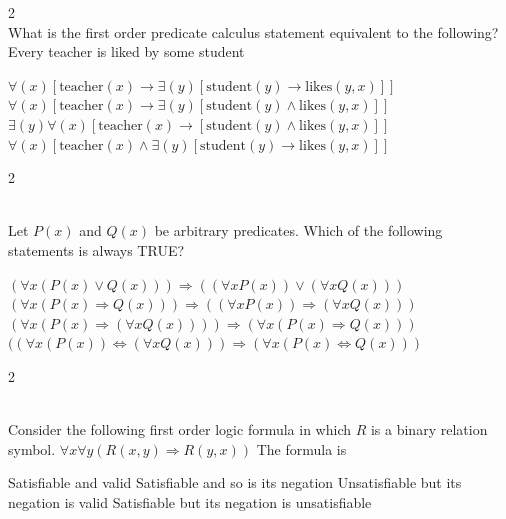 \documentclass[12pt]{exam}
\begin{document}
\begin{questions}
\begin{multicols*}{2}
 \\[0.2cm]
{\Large What is the first order predicate calculus statement equivalent to the following? Every teacher is liked by some student}
\begin{choices}
  \choice $\forall(x) [\text{teacher} (x) \to \exists(y) [\text{student} (y) \to \text{likes} (y, x)]]$
  \choice $\forall(x) [\text{teacher} (x) \to \exists(y) [\text{student} (y) \wedge \text{likes} (y, x)]]$
  \choice $\exists(y) \forall(x) [\text{teacher} (x) \to [\text{student} (y) \wedge \text{likes} (y, x)]]$
  \choice $\forall(x) [\text{teacher} (x) \wedge \exists(y) [\text{student} (y) \to \text{likes} (y, x)]]$
\end{choices}

\end{multicols*}
\vspace{0.6cm}
\newpage
\begin{multicols*}{2}

 \\[0.2cm]
{\Large Let $P(x)$ and $Q(x)$ be arbitrary predicates. Which of the following statements is always TRUE?}
\begin{choices}
  \choice $(\forall x(P(x) \vee Q(x))) \Rightarrow ((\forall x P(x)) \vee (\forall x Q(x)))$
  \choice $(\forall x(P(x) \Rightarrow Q(x))) \Rightarrow ((\forall x P(x)) \Rightarrow (\forall x Q(x)))$
  \choice $(\forall x(P(x) \Rightarrow (\forall x Q(x)))) \Rightarrow (\forall x(P(x) \Rightarrow Q(x)))$
  \choice $((\forall x(P(x)) \Leftrightarrow (\forall x Q(x))) \Rightarrow (\forall x(P(x) \Leftrightarrow Q(x)))$
\end{choices}

\end{multicols*}
\vspace{0.6cm}
\newpage
\begin{multicols*}{2}

 \\[0.2cm]
{\Large Consider the following first order logic formula in which $R$ is a binary relation symbol.\newline
$\forall x \forall y (R(x, y) \Rightarrow R(y, x))$ The formula is}
\begin{choices}
  \choice Satisfiable and valid
  \choice Satisfiable and so is its negation
  \choice Unsatisfiable but its negation is valid
  \choice Satisfiable but its negation is unsatisfiable
\end{choices}


\end{multicols*}
\end{questions}
\end{document}

